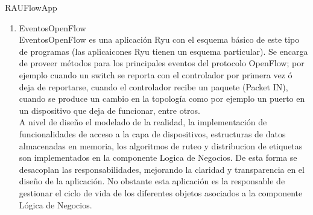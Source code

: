 \begin{subsubsection}{RAUFlowApp}





\begin{enumerate}

\item EventosOpenFlow\\
EventosOpenFlow es una aplicaci\'on Ryu con el esquema b\'asico de este tipo de programas (las aplicaicones Ryu tienen un esquema particular). Se encarga de proveer m\'etodos para los principales eventos del protocolo OpenFlow; por ejemplo cuando un switch se reporta con el controlador por primera vez \'o deja de reportarse, cuando el controlador recibe un paquete (Packet IN), cuando se produce un cambio en la topolog\'ia como por ejemplo un puerto en un dispositivo que deja de funcionar, entre otros.\\

A nivel de diseño el modelado de la realidad, la implementaci\'on de funcionalidades de acceso a la capa de dispositivos, estructuras de datos almacenadas en memoria, los algoritmos de ruteo y distribucion de etiquetas son implementados en la componente Logica de Negocios. De esta forma se desacoplan las responsabilidades, mejorando la claridad y transparencia en el diseño de la aplicaci\'on. No obstante esta aplicación es la responsable de gestionar el ciclo de vida de los diferentes objetos asociados a la componente Lógica de Negocios.
  

\end{enumerate}
\end{subsubsection}
